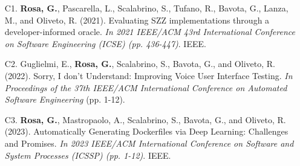      \begin{itemize}
      \item[C1.] \textbf{Rosa, G.}, Pascarella, L., Scalabrino, S., Tufano, R., Bavota, G., Lanza, M., and Oliveto, R. (2021). Evaluating SZZ implementations through a developer-informed oracle. \emph{In 2021 IEEE/ACM 43rd International Conference on Software Engineering (ICSE) (pp. 436-447)}. IEEE.
      \item[C2.] Guglielmi, E., \textbf{Rosa, G.}, Scalabrino, S., Bavota, G., and Oliveto, R. (2022). Sorry, I don't Understand: Improving Voice User Interface Testing. \emph{In Proceedings of the 37th IEEE/ACM International Conference on Automated Software Engineering} (pp. 1-12).
      \item[C3.] \textbf{Rosa, G.}, Mastropaolo, A., Scalabrino, S., Bavota, G., and Oliveto, R. (2023). Automatically Generating Dockerfiles via Deep Learning: Challenges and Promises. \emph{In 2023 IEEE/ACM International Conference on Software and System Processes (ICSSP) (pp. 1-12)}. IEEE.
     \end{itemize}